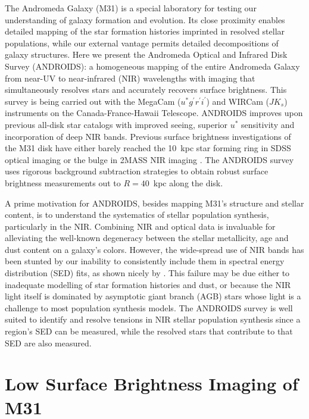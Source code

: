 \documentclass[11pt,twoside]{article}
\begin{document}
The Andromeda Galaxy (M31) is a special laboratory for testing our understanding of galaxy formation and evolution.
Its close proximity enables detailed mapping of the star formation histories imprinted in resolved stellar populations, while our external vantage permits detailed decompositions of galaxy structures.
Here we present the Andromeda Optical and Infrared Disk Survey (ANDROIDS): a homogeneous mapping of the entire Andromeda Galaxy from near-UV to near-infrared (NIR) wavelengths with imaging that simultaneously resolves stars and accurately recovers surface brightness.
This survey is being carried out with the MegaCam ($u^*g^\prime r^\prime i^\prime$) and WIRCam ($JK_s$) instruments on the Canada-France-Hawaii Telescope.
ANDROIDS improves upon previous all-disk star catalogs \citep[e.g., the Local Group Galaxy Survey;][]{Massey:2006} with improved seeing, superior $u^*$ sensitivity and incorporation of deep NIR bands.
Previous surface brightness investigations of the M31 disk have either barely reached the 10~kpc star forming ring in SDSS optical imaging \citep{Tamm:2012} or the bulge in 2MASS NIR imaging \cite{Beaton:2007}.
The ANDROIDS survey uses rigorous background subtraction strategies to obtain robust surface brightness measurements out to $R=40$~kpc along the disk.

A prime motivation for ANDROIDS, besides mapping M31's structure and stellar content, is to understand the systematics of stellar population synthesis, particularly in the NIR.
Combining NIR and optical data is invaluable for alleviating the well-known degeneracy between the stellar metallicity, age and dust content on a galaxy's colors.
However, the wide-spread use of NIR bands has been stunted by our inability to consistently include them in spectral energy distribution (SED) fits, as shown nicely by \cite{Taylor:2011}.
This failure may be due either to inadequate modelling of star formation histories and dust, or because the NIR light itself is dominated by asymptotic giant branch (AGB) stars whose light is a challenge to most population synthesis models.
The ANDROIDS survey is well suited to identify and resolve tensions in NIR stellar population synthesis since a region's SED can be measured, while the resolved stars that contribute to that SED are also measured.

\section{Low Surface Brightness Imaging of M31}
\end{document}
